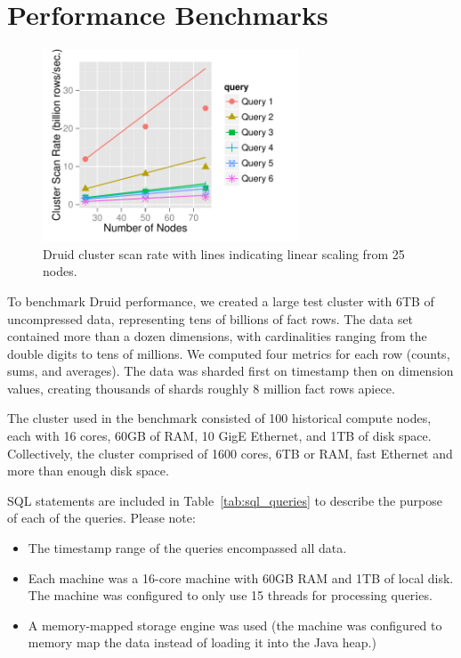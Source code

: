 \documentclass{vldb}
\begin{document}
\section{Performance Benchmarks}
\label{sec:benchmarks}
\begin{figure}
\centering
\includegraphics[width = 3in]{cluster_scan_rate}
\caption{Druid cluster scan rate with lines indicating linear scaling
  from 25 nodes.}
\label{fig:cluster_scan_rate}
\end{figure}
To benchmark Druid performance, we created a large test cluster with
6TB of uncompressed data, representing tens of billions of fact
rows. The data set contained more than a dozen dimensions, with
cardinalities ranging from the double digits to tens of millions. We computed
four metrics for each row (counts, sums, and averages). The data was
sharded first on timestamp then on dimension values, creating
thousands of shards roughly 8 million fact rows apiece.

The cluster used in the benchmark consisted of 100 historical compute
nodes, each with 16 cores, 60GB of RAM, 10 GigE Ethernet, and 1TB of
disk space. Collectively, the cluster comprised of 1600 cores, 6TB or
RAM, fast Ethernet and more than enough disk space.

SQL statements are included in Table~\ref{tab:sql_queries} to describe the
purpose of each of the queries. Please note:
\begin{itemize}
\item The timestamp range of the queries encompassed all data.
\item Each machine was a 16-core machine with 60GB RAM and 1TB of local
  disk. The machine was configured to only use 15 threads for
  processing queries.
\item A memory-mapped storage engine was used (the machine was configured to memory map the data
  instead of loading it into the Java heap.)
\end{itemize}
\end{document}
